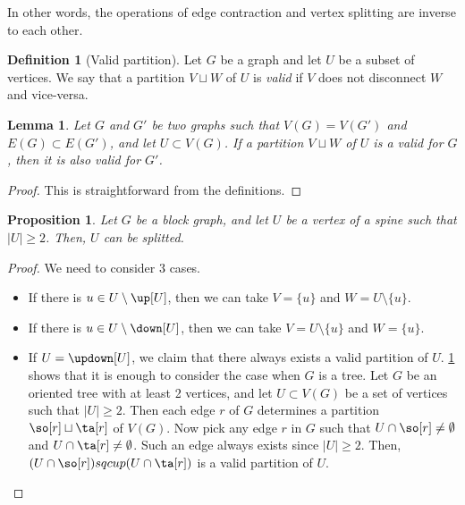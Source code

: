 \documentclass{amsart}
\newtheorem{proposition}[theorem]{Proposition}
\newtheorem{lemma}[theorem]{Lemma}
\theoremstyle{definition}
\newtheorem{definition}[theorem]{Definition}
\begin{document}
In other words, the operations of edge contraction and vertex splitting are inverse to each other.

 
\begin{definition}[Valid partition] 
  Let $G$ be a graph and let $U$ be a subset of vertices. We say that a partition $V \sqcup W$ of $U$ is \emph{valid} if $V$ does not disconnect $W$ and vice-versa.
\end{definition}
  
\begin{lemma} 
  \label{lemma:validpartition} 
  Let $G$ and $G'$ be two graphs such that $V(G)=V(G')$ and $E(G) \subset E(G')$, and let $U \subset V(G)$. If a partition $V \sqcup W$ of $U$ is a valid for $G$, then it is also valid for $G'$.
\end{lemma}

\begin{proof}
  This is straightforward from the definitions. 
\end{proof}
  
\begin{proposition} 
  Let $G$ be a block graph, and let $U$ be a vertex of a spine such that $|U|\geq 2$. Then, $U$ can be splitted. 
\end{proposition}

\begin{proof} 
  We need to consider 3 cases.
  \begin{itemize}
    
    \item If there is $u \in U\setminus\up[U]$, then we can take $V=\{u\}$ and $W = U \setminus \{u\}$.
    
    \item If there is $u \in U\setminus\down[U]$, then we can take $V=U\setminus\{u\}$ and $W=\{u\}$.
    
    \item If $U=\updown[U]$, we claim that there always exists a valid partition of $U$. \cref{lemma:validpartition} shows that it is enough to consider the case when $G$ is a tree. Let $G$ be an oriented tree with at least 2 vertices, and let $U \subset V(G)$ be a set of vertices such that $|U|\geq 2$. Then each edge $r$ of $G$ determines a partition $\so[r] \sqcup \ta[r]$ of $V(G)$. Now pick any edge $r$ in $G$ such that $U \cap \so[r] \neq \emptyset$ and $U \cap \ta[r] \neq \emptyset$. Such an edge always exists since $|U|\geq 2$. Then, $(U \cap \so[r]) sqcup (U \cap \ta[r])$ is a valid partition of $U$.
  
  \end{itemize}
\end{proof}
  
\end{document}
